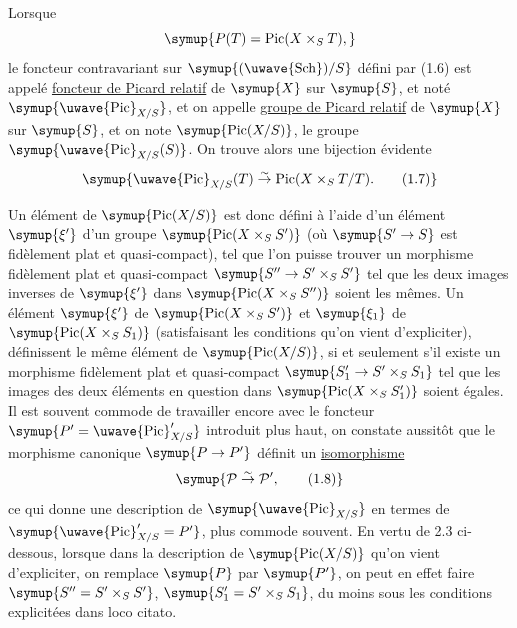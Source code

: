 Lorsque
\[
\symup{P(T)=\operatorname{Pic}(X\times_ST),}
\]
le foncteur contravariant sur $\symup{(\text{\uwave{Sch}})/S}$ défini par (1.6) est appelé
\uline{foncteur de Picard relatif} de $\symup{X}$ sur $\symup{S}$, et noté
$\symup{\mathop{\text{\uwave{Pic}}}\nolimits_{X/S}}$, et on appelle \uline{groupe de Picard relatif} de
$\symup{X}$ sur $\symup{S}$, et on note $\symup{\operatorname{Pic}(X/S)}$, le groupe
$\symup{\mathop{\text{\uwave{Pic}}}\nolimits_{X/S}(S)}$. On trouve alors une bijection évidente
\begin{equation}
\symup{\mathop{\text{\uwave{Pic}}}\nolimits_{X/S}(T)\overset{\sim}{\to}\operatorname{Pic}(X\times_ST/T).
\tag{1.7}}
\end{equation}

Un élément de $\symup{\operatorname{Pic}(X/S)}$ est donc défini à l'aide d'un élément
$\symup{\xi'}$ d'un groupe $\symup{\operatorname{Pic}(X\times_SS')}$ (où $\symup{S'\to S}$
est fidèlement plat et quasi-compact), tel que l'on puisse trouver un morphisme
fidèlement plat et quasi-compact $\symup{S''\to S'\times_SS'}$ tel que les
deux images inverses de $\symup{\xi'}$ dans $\symup{\operatorname{Pic}(X\times_SS'')}$ soient
les mêmes. Un élément $\symup{\xi'}$ de $\symup{\operatorname{Pic}(X\times_SS')}$ et $\symup{\xi_1}$
de $\symup{\operatorname{Pic}(X\times_SS_1)}$ (satisfaisant les conditions qu'on vient
d'expliciter), définissent le même élément de $\symup{\operatorname{Pic}(X/S)}$, si et
seulement s'il existe un morphisme fidèlement plat et quasi-compact
$\symup{S'_1\to S'\times_SS_1}$ tel que les images des deux éléments en
question dans $\symup{\operatorname{Pic}(X\times_SS'_1)}$ soient égales. Il est souvent
commode de travailler encore avec le foncteur
$\symup{P'=\mathop{\text{\uwave{Pic}}}\nolimits'_{X/S}}$ introduit plus haut, on constate aussitôt que
le morphisme canonique $\symup{P\to P'}$ définit un \uline{isomorphisme}
\begin{equation}
\symup{\mathcal P\overset{\sim}{\to}\mathcal P',
\tag{1.8}}
\end{equation}
ce qui donne une description de $\symup{\mathop{\text{\uwave{Pic}}}\nolimits_{X/S}}$ en termes de
$\symup{\mathop{\text{\uwave{Pic}}}\nolimits'_{X/S}=P'}$, plus commode souvent. En vertu de 2.3
ci-dessous, lorsque dans la description de $\symup{\operatorname{Pic}(X/S)}$ qu'on
vient d'expliciter, on remplace $\symup{P}$ par $\symup{P'}$, on peut en effet
faire $\symup{S''=S'\times_SS'}$, $\symup{S'_1=S'\times_SS_1}$, du moins sous les conditions
explicitées dans loco citato.

